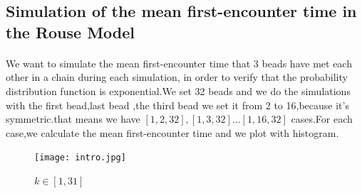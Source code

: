 \documentclass{article}
\begin{document}
\subsection{Simulation of the mean first-encounter time in the Rouse Model}
\paragraph{}
We want to simulate the mean first-encounter time that 3 beads have met each other in a chain during each simulation, in order to verify that the probability distribution function is exponential.We set 32 beads and we do the simulations with the first bead,last bead ,the third bead we set it from 2 to 16,because it's symmetric.that means we have $[1,2,32],[1,3,32]...[1,16,32]$ cases.For each case,we calculate the mean first-encounter time and we plot with histogram.
\begin{figure}[H]
	\texttt{[image: intro.jpg]}
	\caption{$k\in [1,31]$ }
\end{figure}
\end{document}
